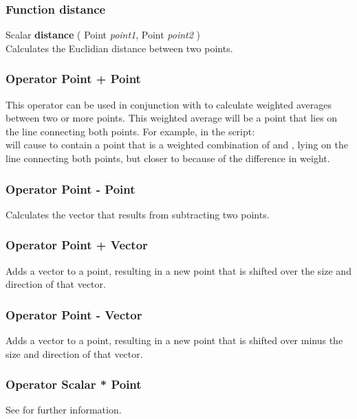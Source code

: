 \subsubsection{Function distance \label{F:distance}}
Scalar \textbf{distance} ( Point \textit{point1}, Point \textit{point2} ) \\
Calculates the Euclidian distance between two points.

\subsubsection{Operator Point + Point \label{O:Point+Point}}
This operator can be used in conjunction with  to calculate weighted averages between two or more points. This weighted average will be a point that lies on the line connecting both points.
For example, in the script: \\
will cause  to contain a point that is a weighted combination of  and , lying on the line connecting both points, but closer to  because of the difference in weight.

\subsubsection{Operator Point - Point \label{O:Point-Point}}
Calculates the vector that results from subtracting two points.

\subsubsection{Operator Point + Vector \label{O:Point+Vector}}
Adds a vector to a point, resulting in a new point that is shifted over the size and direction of that vector.

\subsubsection{Operator Point - Vector \label{O:Point-Vector}}
Adds a vector to a point, resulting in a new point that is shifted over minus the size and direction of that vector.

\subsubsection{Operator Scalar * Point \label{O:Scalar*Point}}
See  for further information.

